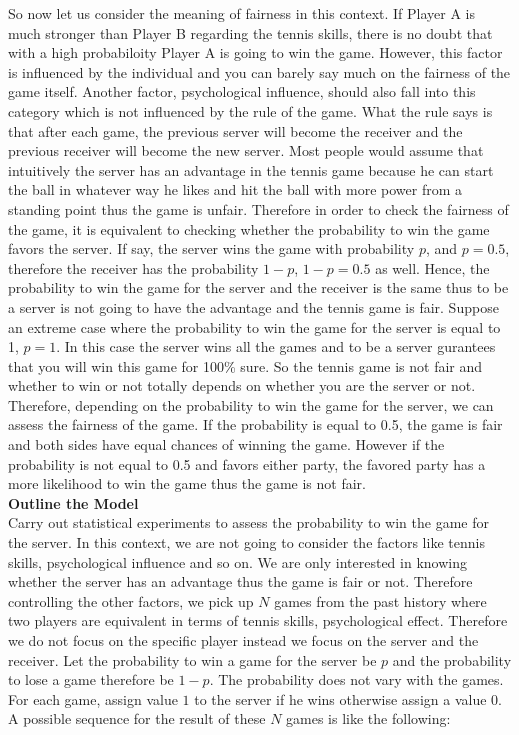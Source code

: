\documentclass[12pt]{article}
\begin{document}
So now let us consider the meaning of fairness in this context. If Player A is much stronger than Player B regarding the tennis skills, there is no doubt that with a high probabiloity Player A is going to win the game. However, this factor is influenced by the individual and you can barely say much on the fairness of the game itself. Another factor, psychological influence, should also fall into this category which is not influenced by the rule of the game. What the rule says is that after each game, the previous server will become the receiver and the previous receiver will become the new server. Most people would assume that intuitively the server has an advantage in the tennis game because he can start the ball in whatever way he likes and hit the ball with more power from a standing point thus the game is unfair. Therefore in order to check the fairness of the game, it is equivalent to checking whether the probability to win the game favors the server. If say, the server wins the game with probability $p$, and $p=0.5$, therefore the receiver has the probability $1-p$, $1-p=0.5$ as well. Hence, the probability to win the game for the server and the receiver is the same thus to be a server is not going to have the advantage and the tennis game is fair. Suppose an extreme case where the probability to win the game for the server is equal to 1, $p=1$. In this case the server wins all the games and to be a server gurantees that you will win this game for 100\% sure. So the tennis game is not fair and whether to win or not totally depends on whether you are the server or not. Therefore, depending on the probability to win the game for the server, we can assess the fairness of the game. If the probability is equal to 0.5, the game is fair and both sides have equal chances of winning the game. However if the probability is not equal to 0.5 and favors either party, the favored party has a more likelihood to win the game thus the game is not fair.\\

\noindent\textbf{Outline the Model}\\
Carry out statistical experiments to assess the probability to win the game for the server. In this context, we are not going to consider the factors like tennis skills, psychological influence and so on. We are only interested in knowing whether the server has an advantage thus the game is fair or not. Therefore controlling the other factors, we pick up $N$ games from the past history where two players are equivalent in terms of tennis skills, psychological effect. Therefore we do not focus on the specific player instead we focus on the server and the receiver. Let the probability to win a game for the server be $p$ and the probability to lose a game therefore be $1-p$. The probability does not vary with the games. For each game, assign value $1$ to the server if he wins otherwise assign a value $0$. A possible sequence for the result of these $N$ games is like the following:\\
\end{document}

